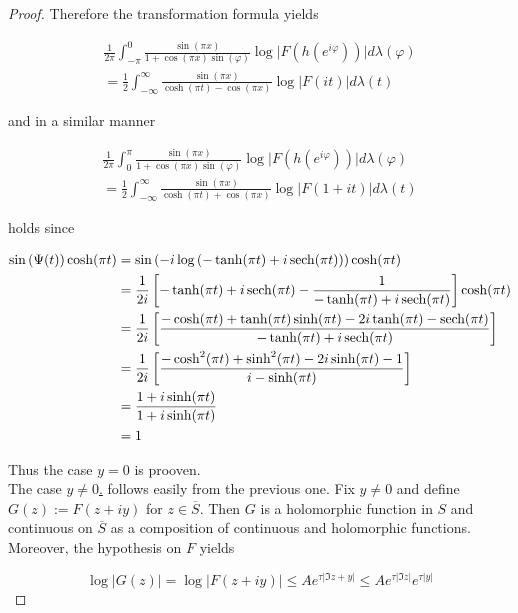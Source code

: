 \begin{proof}
Therefore the transformation formula yields

\begin{multline}
	\frac{1}{2\pi} \int_{-\pi}^0 \frac{\sin(\pi x)}{1 + \cos(\pi x)\sin(\varphi)} \log \vert F(h(e^{i\varphi}))\vert d\lambda(\varphi)\\ = \frac{1}{2}\int_{-\infty}^\infty\frac{\sin(\pi x)}{\cosh(\pi t) - \cos(\pi x)} \log\vert F(it) \vert d\lambda(t)
\end{multline}
				
and in a similar manner
		
\begin{multline}
	\frac{1}{2\pi} \int_0^\pi \frac{\sin(\pi x)}{1 + \cos(\pi x)\sin(\varphi)} \log \vert F(h(e^{i\varphi}))\vert d\lambda(\varphi)\\ = \frac{1}{2}\int_{-\infty}^\infty\frac{\sin(\pi x)}{\cosh(\pi t) + \cos(\pi x)} \log\vert F(1 + it) \vert d\lambda(t)
\end{multline}

holds since

\begin{gather*}
	\begin{aligned}
		\sin\left(\Psi(t)\right)\cosh(\pi t) &= \sin\left( -i\log\left( -\tanh (\pi t) + i \operatorname{sech}(\pi t) \right)\right) \cosh(\pi t)\\
		&= \frac{1}{2i} \left[ -\tanh(\pi t) + i\operatorname{sech}(\pi t) - \frac{1}{-\tanh(\pi t) + i\operatorname{sech}(\pi t) }\right]\cosh(\pi t)\\
		&= \frac{1}{2i} \left[ \frac{-\cosh(\pi t) + \tanh(\pi t) \sinh(\pi t) - 2i\tanh(\pi t) - \operatorname{sech}(\pi t)}{-\tanh(\pi t) + i\operatorname{sech}(\pi t)}\right]\\
		&= \frac{1}{2i} \left[ \frac{- \cosh^2(\pi t) + \sinh^2(\pi t) - 2i \sinh(\pi t) - 1}{i - \sinh(\pi t)}\right]\\
		&= \frac{1 + i\sinh(\pi t)}{1 + i\sinh(\pi t)}\\
		&= 1
	\end{aligned}
\end{gather*}

Thus the case $y = 0$ is prooven.\\
The case \underline{$y \neq 0$.} follows easily from the previous one. Fix $y \neq 0$ and define $G(z) := F(z + iy)$ for $z \in \overline{S}$. Then $G$ is a holomorphic function in $S$ and continuous on $\overline{S}$ as a composition of continuous and holomorphic functions. Moreover, the hypothesis on $F$ yields

		\begin{equation}
			\log \vert G(z) \vert = \log \vert F(z + iy) \vert \leqslant Ae^{\tau \vert \Im z + y\vert} \leqslant Ae^{\tau \vert \Im z \vert}e^{\tau \vert y \vert}
		\end{equation}


\end{proof}

